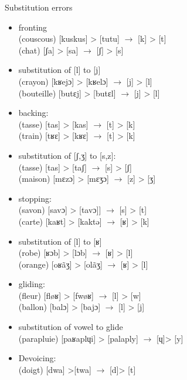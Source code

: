 \documentclass[output=paper,newtxmath,modfonts,nonflat,draftmode]{langsci/langscibook}
\begin{document}
\begin{exe}
\ex Substitution errors \label{ex:takam:substitution_errors}
\begin{itemize}
\item {fronting}\\
(couscous) [kuskus] > [tutu] $\rightarrow$ [k] > [t]\\
(chat) [ʃa] > [sa] $\rightarrow$ [ʃ] > [s]\\

\item {substitution} {of} {[l]} {to} {[j]}\\
 (crayon) [kʁejɔ] > [kʁelɔ] $\rightarrow$ [j] > [l]\\ 
(bouteille) [butɛj] > [butɛl] $\rightarrow$ [j] > [l]\\

\item {backing}: \\
(tasse) [tas] > [kas] $\rightarrow$ [t] > [k]\\
(train) [tʁɛ] > [kʁɛ] $\rightarrow$ [t] > [k]\\

\item {substitution of [ʃ,ʒ] to [s,z]:}\\ 
(tasse) [tas] > [taʃ] $\rightarrow$ [s] > [ʃ]\\
(maison) [mɛzɔ] > [mɛʒɔ] $\rightarrow$ [z] > [ʒ] \\

\item {stopping}: \\
(savon) [savɔ] > [tavɔ]] $\rightarrow$ [s] > [t]\\ 
(carte) [kaʁt] > [kaktə] $\rightarrow$ [ʁ] > [k]\\

\item {substitution of [l] to [ʁ]}\\
(robe) [ʁɔb] > [lɔb] $\rightarrow$ [ʁ] > [l]\\ 
(orange) [oʁãʒ] > [olãʒ] $\rightarrow$ [ʁ] > [l]\\

\item {gliding}:\\
(fleur) [fløʁ] > [fwøʁ] $\rightarrow$ [l] > [w]\\ 
(ballon) [balɔ] > [bajɔ] $\rightarrow$ [l] > [j]\\

\item {substitution of vowel to glide}\\
(parapluie) [paʁaplɥi] > [palaply] $\rightarrow$ [ɥ]> [y]\\

\item {Devoicing}:\\
(doigt) [dwa] >[twa] $\rightarrow$ [d]> [t]\\
\end{itemize}
\end{exe}
\end{document}
